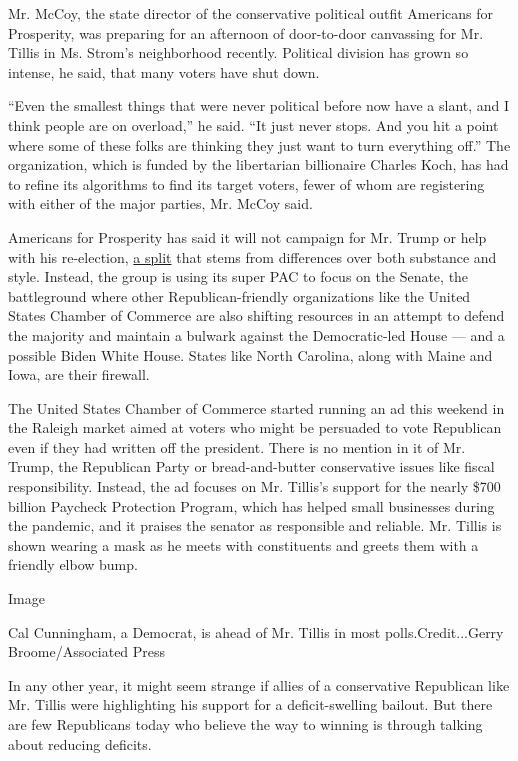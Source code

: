 Mr. McCoy, the state director of the conservative political outfit
Americans for Prosperity, was preparing for an afternoon of door-to-door
canvassing for Mr. Tillis in Ms. Strom's neighborhood recently.
Political division has grown so intense, he said, that many voters have
shut down.

``Even the smallest things that were never political before now have a
slant, and I think people are on overload,'' he said. ``It just never
stops. And you hit a point where some of these folks are thinking they
just want to turn everything off.'' The organization, which is funded by
the libertarian billionaire Charles Koch, has had to refine its
algorithms to find its target voters, fewer of whom are registering with
either of the major parties, Mr. McCoy said.

Americans for Prosperity has said it will not campaign for Mr. Trump or
help with his re-election,
\href{https://www.nytimes3xbfgragh.onion/2018/07/31/us/politics/trump-koch-brothers.html}{a
split} that stems from differences over both substance and style.
Instead, the group is using its super PAC to focus on the Senate, the
battleground where other Republican-friendly organizations like the
United States Chamber of Commerce are also shifting resources in an
attempt to defend the majority and maintain a bulwark against the
Democratic-led House --- and a possible Biden White House. States like
North Carolina, along with Maine and Iowa, are their firewall.

The United States Chamber of Commerce started running an ad this weekend
in the Raleigh market aimed at voters who might be persuaded to vote
Republican even if they had written off the president. There is no
mention in it of Mr. Trump, the Republican Party or bread-and-butter
conservative issues like fiscal responsibility. Instead, the ad focuses
on Mr. Tillis's support for the nearly \$700 billion Paycheck Protection
Program, which has helped small businesses during the pandemic, and it
praises the senator as responsible and reliable. Mr. Tillis is shown
wearing a mask as he meets with constituents and greets them with a
friendly elbow bump.

Image

Cal Cunningham, a Democrat, is ahead of Mr. Tillis in most
polls.Credit...Gerry Broome/Associated Press

In any other year, it might seem strange if allies of a conservative
Republican like Mr. Tillis were highlighting his support for a
deficit-swelling bailout. But there are few Republicans today who
believe the way to winning is through talking about reducing deficits.

